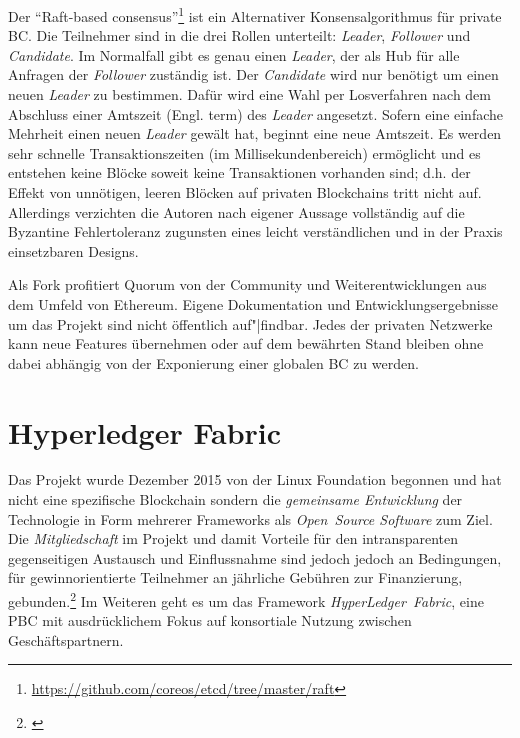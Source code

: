 
Der \enquote{Raft-based consensus}\footnote{\url{https://github.com/coreos/etcd/tree/master/raft}} ist ein Alternativer Konsensalgorithmus für private \gls{BC}. Die Teilnehmer sind in die drei Rollen unterteilt:
\emph{Leader}, \emph{Follower} und \emph{Candidate}. Im Normalfall gibt es genau einen \emph{Leader}, der als Hub für alle Anfragen der \emph{Follower} zuständig ist.
Der \emph{Candidate} wird nur benötigt um einen neuen \emph{Leader} zu bestimmen.
Dafür wird eine Wahl per Losverfahren nach dem Abschluss einer Amtszeit (Engl. term) des \emph{Leader} angesetzt.
Sofern eine einfache Mehrheit einen neuen \emph{Leader} gewält hat, beginnt eine neue Amtszeit.
Es werden sehr schnelle Transaktionszeiten (im Millisekundenbereich) ermöglicht und es entstehen keine Blöcke soweit keine Transaktionen vorhanden sind;
d.h. der Effekt von unnötigen, leeren Blöcken auf privaten Blockchains tritt nicht auf.
Allerdings verzichten die Autoren nach eigener Aussage vollständig auf die Byzantine Fehlertoleranz zugunsten eines leicht verständlichen und in der Praxis einsetzbaren Designs. 

Als Fork profitiert Quorum von der Community und Weiterentwicklungen aus dem Umfeld von Ethereum.
Eigene Dokumentation und Entwicklungsergebnisse um das Projekt sind nicht öffentlich auf"|findbar. 
Jedes der privaten Netzwerke kann neue Features übernehmen oder auf dem bewährten Stand bleiben
ohne dabei abhängig von der Exponierung einer globalen \gls{BC} zu werden.

\section{Hyperledger Fabric}\label{impl:hyperledger}

Das Projekt wurde Dezember 2015 von der Linux Foundation begonnen und hat nicht eine spezifische Blockchain sondern die \emph{gemeinsame Entwicklung} der Technologie in Form mehrerer Frameworks als \emph{Open~Source Software} zum Ziel.
Die \emph{Mitgliedschaft} im Projekt und damit Vorteile für den intransparenten gegenseitigen Austausch und Einflussnahme sind jedoch jedoch an Bedingungen, für gewinnorientierte Teilnehmer an jährliche Gebühren zur Finanzierung, gebunden.\footnote{\cite{w:hyperledger:membership}}
Im Weiteren geht es um das Framework \emph{HyperLedger~Fabric}, eine \gls{PBC} mit ausdrücklichem Fokus auf konsortiale Nutzung zwischen Geschäftspartnern.

